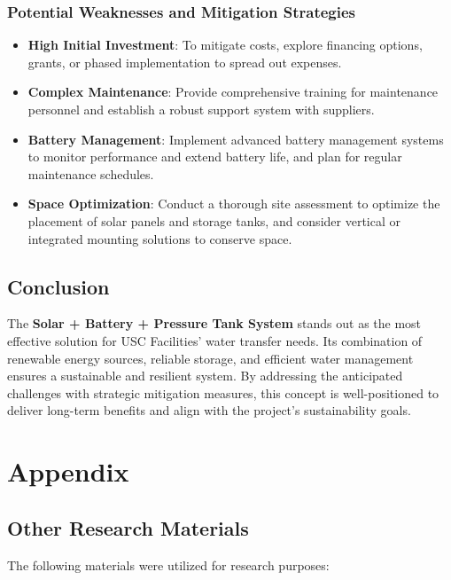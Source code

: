 \documentclass[12pt]{article}
\begin{document}
\subsubsection{Potential Weaknesses and Mitigation Strategies}
\begin{itemize}
    \item \textbf{High Initial Investment}: To mitigate costs, explore financing options, grants, or phased implementation to spread out expenses.
    \item \textbf{Complex Maintenance}: Provide comprehensive training for maintenance personnel and establish a robust support system with suppliers.
    \item \textbf{Battery Management}: Implement advanced battery management systems to monitor performance and extend battery life, and plan for regular maintenance schedules.
    \item \textbf{Space Optimization}: Conduct a thorough site assessment to optimize the placement of solar panels and storage tanks, and consider vertical or integrated mounting solutions to conserve space.
\end{itemize}

\subsection{Conclusion}

The \textbf{Solar + Battery + Pressure Tank System} stands out as the most effective solution for USC Facilities' water transfer needs. Its combination of renewable energy sources, reliable storage, and efficient water management ensures a sustainable and resilient system. By addressing the anticipated challenges with strategic mitigation measures, this concept is well-positioned to deliver long-term benefits and align with the project's sustainability goals.



\newpage
\appendix
\section{Appendix}
    
    \subsection{Other Research Materials}
    The following materials were utilized for research purposes:
    
\end{document}
